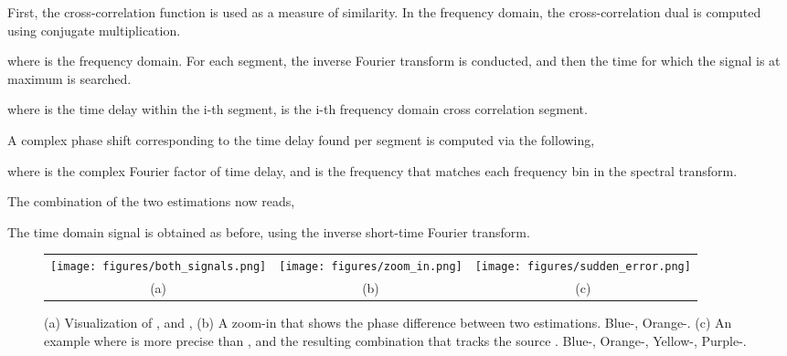 \documentclass{article}
\theoremstyle{plain}
\theoremstyle{definition}
\theoremstyle{remark}
\begin{document}
First, the cross-correlation function is used as a measure of similarity. In the frequency domain, the cross-correlation dual is computed using conjugate multiplication.

where  is the frequency domain. For each segment, the inverse Fourier transform is conducted, and then the time for which the signal is at maximum is searched.

where  is the time delay within the i-th segment,  is the i-th frequency domain cross correlation segment.

A complex phase shift corresponding to the time delay found per segment is computed via the following,

where  is the complex Fourier factor of time delay, and  is the frequency that matches each frequency bin in the spectral transform.

The combination of the two estimations now reads,


The time domain signal is obtained as before, using the inverse short-time Fourier transform.




\begin{figure*}[t]
\begin{tabular}{@{}ccc@{}}
     \texttt{[image: figures/both\_signals.png]}&
     \texttt{[image: figures/zoom\_in.png]}&
     \texttt{[image: figures/sudden\_error.png]}\\
     (a)&(b)&(c)\\
\end{tabular}
    \caption{(a) Visualization of , and , (b) A zoom-in that shows the phase difference between two estimations. Blue-, Orange-. (c) An example where  is more precise than , and the resulting combination that tracks the source . Blue-, Orange-, Yellow-, Purple-.}
    \label{fig:maj_imp}
    \label{fig:vis_zoom}
\end{figure*}
\end{document}
